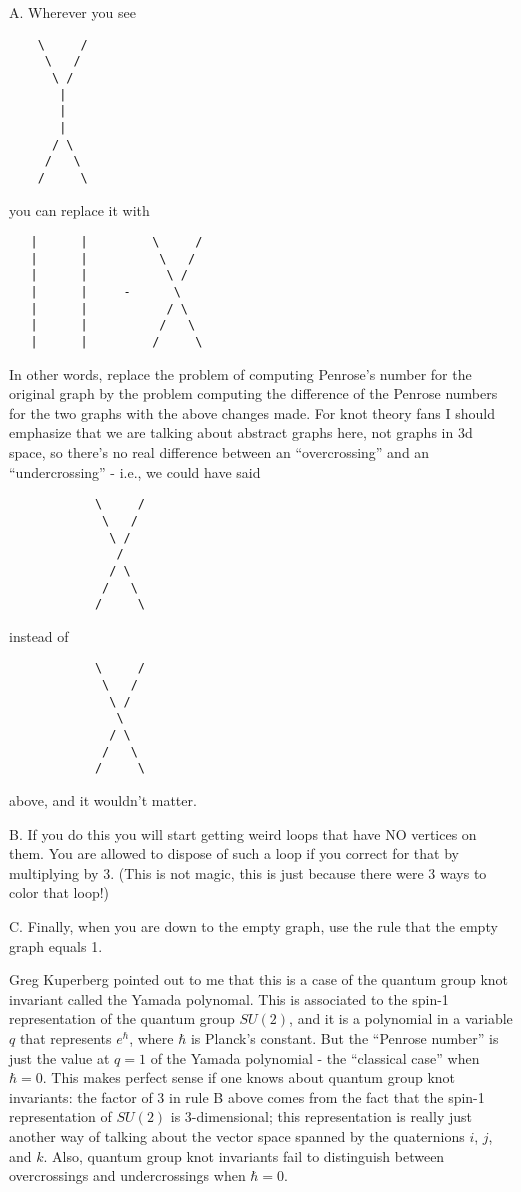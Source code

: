 \documentclass{article}
\begin{document}
A. Wherever you see

\begin{verbatim}
    \     /
     \   /
      \ /
       |
       |
       |
      / \
     /   \
    /     \
\end{verbatim}

you can replace it with

\begin{verbatim}
   |      |         \     /
   |      |          \   /
   |      |           \ /
   |      |     -      \ 
   |      |           / \
   |      |          /   \
   |      |         /     \
\end{verbatim}

In other words, replace the problem of computing Penrose's number for
the original graph by the problem computing the difference of the
Penrose numbers for the two graphs with the above changes made. For knot
theory fans I should emphasize that we are talking about abstract graphs
here, not graphs in 3d space, so there's no real difference between an
``overcrossing'' and an ``undercrossing'' - i.e., we could have said

\begin{verbatim}
            \     /
             \   /
              \ /
               / 
              / \
             /   \
            /     \
\end{verbatim}

instead of

\begin{verbatim}
            \     /
             \   /
              \ /
               \ 
              / \
             /   \
            /     \
\end{verbatim}

above, and it wouldn't matter.

B. If you do this you will start getting weird loops that have NO
vertices on them. You are allowed to dispose of such a loop if you
correct for that by multiplying by 3. (This is not magic, this is just
because there were 3 ways to color that loop!)

C. Finally, when you are down to the empty graph, use the rule that the
empty graph equals 1.

Greg Kuperberg pointed out to me that this is a case of the quantum
group knot invariant called the Yamada polynomal. This is associated to
the spin-1 representation of the quantum group \(SU(2)\), and it is a
polynomial in a variable \(q\) that represents \(e^\hbar\), where
\(\hbar\) is Planck's constant. But the ``Penrose number'' is just the
value at \(q = 1\) of the Yamada polynomial - the ``classical case''
when \(\hbar = 0\). This makes perfect sense if one knows about quantum
group knot invariants: the factor of 3 in rule B above comes from the
fact that the spin-1 representation of \(SU(2)\) is 3-dimensional; this
representation is really just another way of talking about the vector
space spanned by the quaternions \(i\), \(j\), and \(k\). Also, quantum
group knot invariants fail to distinguish between overcrossings and
undercrossings when \(\hbar = 0\).
\end{document}
